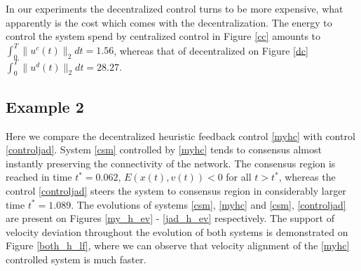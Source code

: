 \documentclass[a4paper, english]{article}
\begin{document}
In our experiments the decentralized control turns to be more expensive, what apparently is the cost which comes with the decentralization.
The energy to control the system spend by centralized control in Figure \ref{cc} amounts to  $\int_{0}^{T} \|u^c(t)\|_2 dt  = 1.56$, whereas that of decentralized on Figure \ref{dc} $\int_{0}^{T} \|u^d(t)\|_2 dt  = 28.27$.



 \subsection{Example 2}
  Here we compare the decentralized heuristic feedback control \eqref{myhc} with control \eqref{controljad}.
System \eqref{csm} controlled by \eqref{myhc} tends to consensus almost instantly preserving the connectivity of the network. The consensus region is reached
  in time   $t^* = 0.062$,  $E(x(t), v(t)) < 0$ for all $t>t^{*}$, whereas the control \eqref{controljad} steers the system to consensus region in considerably larger time  $t^* = 1.089$.
  The evolutions of systems \eqref{csm}, \eqref{myhc} and \eqref{csm}, \eqref{controljad} are present on Figures \ref{my_h_ev} - \ref{jad_h_ev} respectively.
  The support of velocity deviation throughout the evolution of both systems is demonstrated on Figure \ref{both_h_lf}, where we can observe that velocity alignment of the \eqref{myhc} controlled system is much faster.
\end{document}
